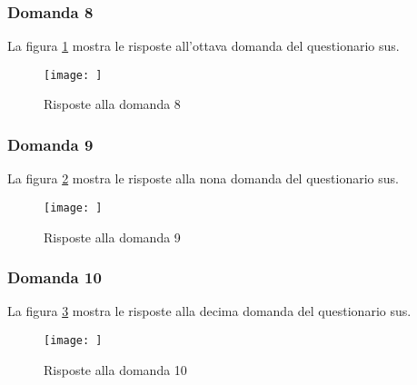 \subsubsection*{Domanda 8}

\vspace{5pt}
\begin{minipage}{\textwidth}
  \par\noindent La figura \ref{fig:sus_q8} mostra le risposte all'ottava domanda del questionario \gls{sus}.
  \begin{figure}[H]
    \centering
    \texttt{[image: ]}
    \caption{Risposte alla domanda 8}
    \label{fig:sus_q8}
  \end{figure}
\end{minipage}

\subsubsection*{Domanda 9}

\vspace{5pt}
\begin{minipage}{\textwidth}
  \par\noindent La figura \ref{fig:sus_q9} mostra le risposte alla nona domanda del questionario \gls{sus}.
  \begin{figure}[H]
    \centering
    \texttt{[image: ]}
    \caption{Risposte alla domanda 9}
    \label{fig:sus_q9}
  \end{figure}
\end{minipage}

\subsubsection*{Domanda 10}

\vspace{5pt}
\begin{minipage}{\textwidth}
  \par\noindent La figura \ref{fig:sus_q10} mostra le risposte alla decima domanda del questionario \gls{sus}.
  \begin{figure}[H]
    \centering
    \texttt{[image: ]}
    \caption{Risposte alla domanda 10}
    \label{fig:sus_q10}
  \end{figure}
\end{minipage}

